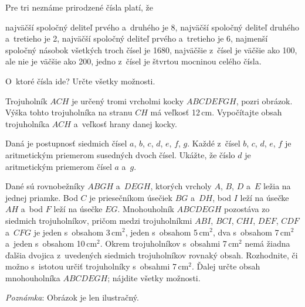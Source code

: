 {%
Pre tri neznáme prirodzené čísla platí, že
\begin{itemize}
\iitem najväčší spoločný deliteľ prvého a~druhého je 8,
\iitem najväčší spoločný deliteľ druhého a~tretieho je 2,
\iitem najväčší spoločný deliteľ prvého a~tretieho je 6,
\iitem najmenší spoločný násobok všetkých troch čísel je 1680,
\iitem najväčšie z~čísel je väčšie ako 100, ale nie je väčšie ako 200,
\iitem jedno z~čísel je štvrtou mocninou celého čísla.
\end{itemize}
O~ktoré čísla ide? Určte všetky možnosti.
}

{%
Trojuholník $ACH$ je určený tromi vrcholmi kocky $ABCDEFGH$, pozri obrázok.
Výška tohto trojuholníka na stranu $CH$ má veľkosť 12\,cm.
Vypočítajte obsah trojuholníka $ACH$ a~veľkosť hrany danej kocky.
\ifobrazkyvedla\else{}\fi
}

{%
Daná je postupnosť siedmich čísel $a$, $b$, $c$, $d$, $e$, $f$, $g$.
Každé z~čísel $b$, $c$, $d$, $e$, $f$ je aritmetickým priemerom susedných dvoch čísel.
Ukážte, že číslo $d$ je aritmetickým priemerom čísel $a$ a~$g$.}

{%
Dané sú rovnobežníky $ABGH$ a~$DEGH$, ktorých vrcholy $A$, $B$, $D$ a~$E$ ležia na jednej priamke.
Bod $C$ je priesečníkom úsečiek $BG$ a~$DH$,
bod $I$ leží na úsečke $AH$ a~bod $F$ leží na úsečke $EG$.
Mnohouholník $ABCDEGH$ pozostáva zo siedmich trojuholníkov, pričom medzi trojuholníkmi $ABI$, $BCI$, $CHI$, $DEF$, $CDF$ a~$CFG$ je jeden s~obsahom 3\,cm$^2$, jeden s~obsahom 5\,cm$^2$, dva s~obsahom 7\,cm$^2$ a~jeden s~obsahom 10\,cm$^2$.
Okrem trojuholníkov s~obsahmi 7\,cm$^2$ nemá žiadna ďalšia dvojica z~uvedených siedmich trojuholníkov rovnaký obsah.
Rozhodnite, či možno s~istotou určiť trojuholníky s~obsahmi 7\,cm$^2$.
Ďalej určte obsah mnohouholníka $ABCDEGH$; nájdite všetky možnosti.

{\it Poznámka}: Obrázok je len ilustračný.
\ifobrazkyvedla\else{}\fi
}



